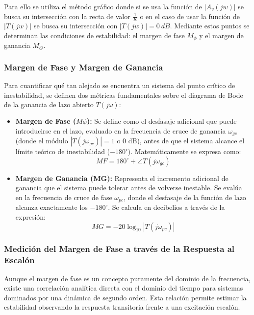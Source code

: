 Para ello se utiliza el método gráfico donde si se usa la función de $|A_v(jw)|$ se busca su intersección con la recta de valor $\frac{1}{K}$ o en el caso de usar la función de $|T(jw)|$ se busca su intersección con $|T(jw)|=0\ dB$. Mediante estos puntos se determinan las condiciones de estabilidad: el margen de fase $M_\phi$ y el margen de ganancia $M_G$.

\subsubsection{Margen de Fase y Margen de Ganancia}

Para cuantificar qué tan alejado se encuentra un sistema del punto crítico de inestabilidad, se definen dos métricas fundamentales sobre el diagrama de Bode de la ganancia de lazo abierto $T(j\omega)$:

\begin{itemize}
    \item \textbf{Margen de Fase ($M\phi$):} Se define como el desfasaje adicional que puede introducirse en el lazo, evaluado en la frecuencia de cruce de ganancia $\omega_{gc}$ (donde el módulo $|T(j\omega_{gc})| = 1$ o $0\text{ dB}$), antes de que el sistema alcance el límite teórico de inestabilidad ($-180^\circ$). Matemáticamente se expresa como:
    \begin{equation}
        MF = 180^\circ + \angle T(j\omega_{gc})
    \end{equation}

    \item \textbf{Margen de Ganancia (MG):} Representa el incremento adicional de ganancia que el sistema puede tolerar antes de volverse inestable. Se evalúa en la frecuencia de cruce de fase $\omega_{pc}$, donde el desfasaje de la función de lazo alcanza exactamente los $-180^\circ$. Se calcula en decibelios a través de la expresión:
    \begin{equation}
        MG = -20 \log_{10} |T(j\omega_{pc})|
    \end{equation}
\end{itemize}

\subsubsection{Medición del Margen de Fase a través de la Respuesta al Escalón}
\label{sec:escalon_mf}

Aunque el margen de fase es un concepto puramente del dominio de la frecuencia, existe una correlación analítica directa con el dominio del tiempo para sistemas dominados por una dinámica de segundo orden. Esta relación permite estimar la estabilidad observando la respuesta transitoria frente a una excitación escalón.

